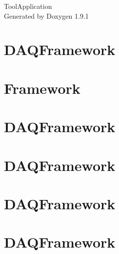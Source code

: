 \let\mypdfximage\pdfximage\def\pdfximage{\immediate\mypdfximage}\documentclass[twoside]{book}
\newcommand{\+}{\discretionary{\mbox{\scriptsize$\hookleftarrow$}}{}{}}
\newcommand{\clearemptydoublepage}{%
  \newpage{\pagestyle{empty}\cleardoublepage}%
}
\begin{document}
\raggedbottom

\hypersetup{pageanchor=false,
             bookmarksnumbered=true,
             pdfencoding=unicode
            }
\begin{titlepage}
\vspace*{7cm}
\begin{center}%
{\Large Tool\+Application }\\
\vspace*{1cm}
{\large Generated by Doxygen 1.9.1}\\
\end{center}
\end{titlepage}
\clearemptydoublepage
{}
\tableofcontents
\clearemptydoublepage
{}
\hypersetup{pageanchor=true}

\chapter{DAQFramework}
\label{md_UserTools_CAMAC_README}

\chapter{Framework}
\label{md_UserTools_ImportedTools_README}

\chapter{DAQFramework}
\label{md_UserTools_InactiveTools_README}

\chapter{DAQFramework}
\label{md_UserTools_LAPPD_README}

\chapter{DAQFramework}
\label{md_UserTools_PGStarter_README}

\chapter{DAQFramework}
\label{md_UserTools_README}

\end{document}
